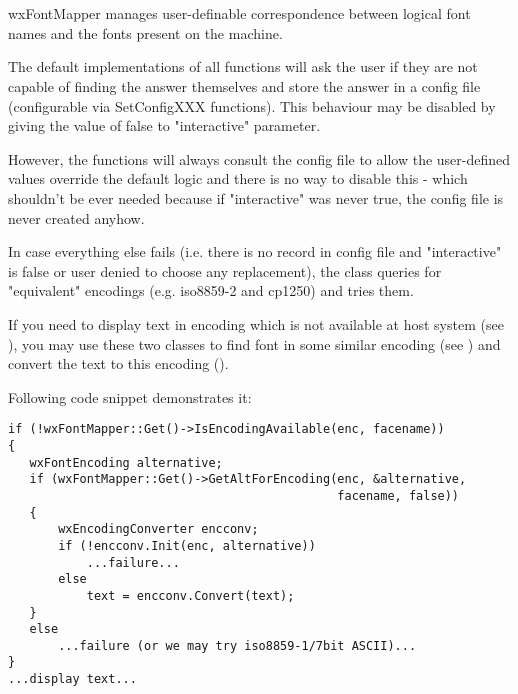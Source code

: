 %
%

\section{}\label{wxfontmapper}

wxFontMapper manages user-definable correspondence between logical font
names and the fonts present on the machine.

The default implementations of all functions will ask the user if they are
not capable of finding the answer themselves and store the answer in a
config file (configurable via SetConfigXXX functions). This behaviour may
be disabled by giving the value of false to "interactive" parameter.

However, the functions will always consult the config file to allow the
user-defined values override the default logic and there is no way to
disable this - which shouldn't be ever needed because if "interactive" was
never true, the config file is never created anyhow.

In case everything else fails (i.e. there is no record in config file
and "interactive" is false or user denied to choose any replacement), 
the class queries  
for "equivalent" encodings (e.g. iso8859-2 and cp1250) and tries them.


If you need to display text in encoding which is not available at
host system (see ),
you may use these two classes to find font in some similar encoding
(see )
and convert the text to this encoding 
().

Following code snippet demonstrates it:

\begin{verbatim}
if (!wxFontMapper::Get()->IsEncodingAvailable(enc, facename))
{
   wxFontEncoding alternative;
   if (wxFontMapper::Get()->GetAltForEncoding(enc, &alternative,
                                              facename, false))
   {
       wxEncodingConverter encconv;
       if (!encconv.Init(enc, alternative))
           ...failure...
       else
           text = encconv.Convert(text);
   }
   else
       ...failure (or we may try iso8859-1/7bit ASCII)...
}
...display text...
\end{verbatim}


